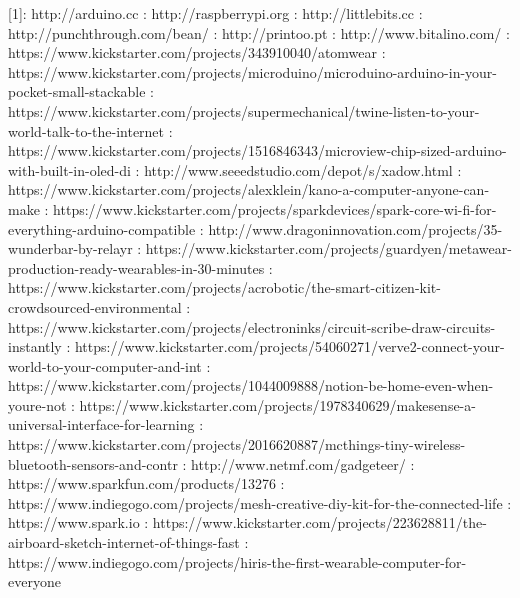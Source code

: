 	[1]: http://arduino.cc  \newline
	[2]: http://raspberrypi.org  \newline
	[3]: http://littlebits.cc  \newline
	[4]: http://punchthrough.com/bean/ \newline
	[5]: http://printoo.pt \newline
	[6]: http://www.bitalino.com/ \newline
	[7]: https://www.kickstarter.com/projects/343910040/atomwear \newline
	[8]: https://www.kickstarter.com/projects/microduino/microduino-arduino-in-your-pocket-small-stackable \newline
	[9]: https://www.kickstarter.com/projects/supermechanical/twine-listen-to-your-world-talk-to-the-internet \newline
	[10]: https://www.kickstarter.com/projects/1516846343/microview-chip-sized-arduino-with-built-in-oled-di \newline
	[11]: http://www.seeedstudio.com/depot/s/xadow.html \newline
	[12]: https://www.kickstarter.com/projects/alexklein/kano-a-computer-anyone-can-make \newline
	[13]: https://www.kickstarter.com/projects/sparkdevices/spark-core-wi-fi-for-everything-arduino-compatible \newline
	[14]: http://www.dragoninnovation.com/projects/35-wunderbar-by-relayr \newline
	[15]: https://www.kickstarter.com/projects/guardyen/metawear-production-ready-wearables-in-30-minutes  \newline
	[16]: https://www.kickstarter.com/projects/acrobotic/the-smart-citizen-kit-crowdsourced-environmental \newline
	[17]: https://www.kickstarter.com/projects/electroninks/circuit-scribe-draw-circuits-instantly \newline
	[18]: https://www.kickstarter.com/projects/54060271/verve2-connect-your-world-to-your-computer-and-int \newline
	[19]: https://www.kickstarter.com/projects/1044009888/notion-be-home-even-when-youre-not \newline
	[20]: https://www.kickstarter.com/projects/1978340629/makesense-a-universal-interface-for-learning \newline
	[21]: https://www.kickstarter.com/projects/2016620887/mcthings-tiny-wireless-bluetooth-sensors-and-contr \newline
	[22]: http://www.netmf.com/gadgeteer/ \newline
	[23]: https://www.sparkfun.com/products/13276 \newline
	[24]: https://www.indiegogo.com/projects/mesh-creative-diy-kit-for-the-connected-life \newline
	[25]: https://www.spark.io \newline
	[26]: https://www.kickstarter.com/projects/223628811/the-airboard-sketch-internet-of-things-fast  \newline
	[27]: https://www.indiegogo.com/projects/hiris-the-first-wearable-computer-for-everyone \newline

	






